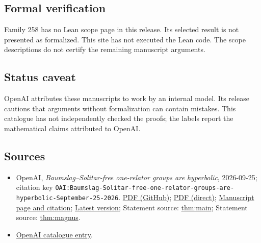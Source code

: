 \documentclass[11pt]{article}
\begin{document}
\subsection{Formal verification}
Family 258 has no Lean scope page in this release. Its selected result is not presented as formalized. This site has not executed the Lean code. The scope descriptions do not certify the remaining manuscript arguments.

\subsection{Status caveat}
OpenAI attributes these manuscripts to work by an internal model. Its release cautions that arguments without formalization can contain mistakes. This catalogue has not independently checked the proofs; the labels report the mathematical claims attributed to OpenAI.

\subsection{Sources}
\begin{itemize}
\item OpenAI, \emph{Baumslag–Solitar-free one-relator groups are hyperbolic}, 2026-09-25; citation key \texttt{OAI:Baumslag-Solitar-free-one-relator-groups-are-hyperbolic-September-25-2026}. \href{https://github.com/openai/math/blob/adc7f1241b42e322a6451854ab7e4b4c146bf78a/preprints/Baumslag-Solitar-free-one-relator-groups-are-hyperbolic-September-25-2026/paper.pdf}{PDF (GitHub)}; \href{https://github.com/openai/math/raw/adc7f1241b42e322a6451854ab7e4b4c146bf78a/preprints/Baumslag-Solitar-free-one-relator-groups-are-hyperbolic-September-25-2026/paper.pdf}{PDF (direct)}; \href{https://github.com/openai/math/blob/adc7f1241b42e322a6451854ab7e4b4c146bf78a/preprints/Baumslag-Solitar-free-one-relator-groups-are-hyperbolic-September-25-2026/README.md}{Manuscript page and citation}; \href{https://github.com/openai/math/blob/main/preprints/Baumslag-Solitar-free-one-relator-groups-are-hyperbolic-September-25-2026/paper.pdf}{Latest version}; Statement source: \href{https://github.com/openai/math/blob/adc7f1241b42e322a6451854ab7e4b4c146bf78a/preprints/Baumslag-Solitar-free-one-relator-groups-are-hyperbolic-September-25-2026/build/source/introduction.tex\#L17}{thm:main}; Statement source: \href{https://github.com/openai/math/blob/adc7f1241b42e322a6451854ab7e4b4c146bf78a/preprints/Baumslag-Solitar-free-one-relator-groups-are-hyperbolic-September-25-2026/build/source/introduction.tex\#L202}{thm:magnus}.
\item \href{https://github.com/openai/math/blob/adc7f1241b42e322a6451854ab7e4b4c146bf78a/CONTENTS.md}{OpenAI catalogue entry}.
\end{itemize}
\end{document}
